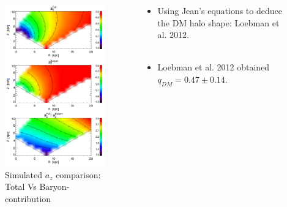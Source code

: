 \documentclass[xcolor=dvipsnames]{beamer}
\begin{document}
\begin{frame}

\begin{columns}[c]

\begin{column}{.5\textwidth}
\begin{figure}
\includegraphics[width=0.6\linewidth]{./pics/loebmanAccelerationCurves.png}
\caption{\tiny Simulated $a_z$ comparison: Total Vs Baryon-contribution}
\end{figure}
\end{column}

\begin{column}{.6\textwidth}
\centering
\small
\begin{itemize}

\item Using Jean's equations to deduce the DM halo shape: Loebman et al. 2012.\\~\\

\item Loebman et al. 2012 obtained $q_{DM} = 0.47 \pm 0.14$.

\end{itemize}

\end{column}

\end{columns}

\end{frame}
\end{document}
